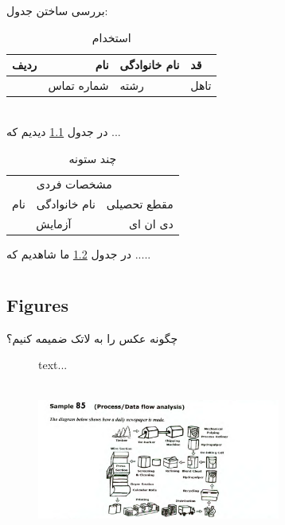 \documentclass{book}
\author{علی}
\begin{document}
	\maketitle
	\tableofcontents
	\singlespacing
	\Time
\chapter{}	
\BNaz
بررسی ساختن جدول:
\begin{table}[h!]

\begin{center}
 \begin{tabular}{|c|r|p{2cm}||l|}
	\hline
	ردیف &
	\textbf{نام} &
	\centering
	 نام خانوادگی & قد \\
	\hline
	&
شماره تماس &
\centering
 رشته & تاهل\\
	\hline
 \end{tabular}
\end{center}
\caption{استخدام}
\label{Tab1}
\end{table}
\\
	در جدول \ref{Tab1} دیدیم که ...
	
\begin{table}[h!]
	\begin{center}
		\begin{tabular}{|c|c|r|}
			\hline
			&
			\multicolumn{2}{|l|}{مشخصات فردی} \\
			\cline{1-3}

نام & نام خانوادگی & مقطع تحصیلی 
\\
\hline
\multicolumn{2}{|c|}{آزمایش} 
&
دی ان ای \\
\hline
		\end{tabular}
	\end{center}
\caption{چند ستونه}
\label{Tab2}
\end{table}
در جدول \ref{Tab2}
ما شاهدیم که .....
\chapter{}
\section{Figures}
چگونه عکس را به لاتک ضمیمه کنیم؟
\begin{figure}[h!]
	\caption*{text...}
	\begin{center}
		\includegraphics[width=8cm, height=5cm]{Capture.PNG}
	\end{center}
\caption{}
\label{Fig1}
\end{figure}
\end{document}
